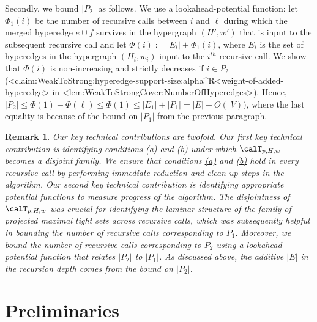 \documentclass{article}
\def\Cref#1{<#1>}%
\newtheorem{remark}{Remark}[section]
\newcommand{\maximalTightSetFamily}[1]{\ensuremath{\calT_{#1}}\xspace}
\newcommand{\kristof}[1]{{\color{purple}[{\tiny Kristof: \bf #1}]\marginpar{\color{red}*}}}
\begin{document}
Secondly, we bound $|P_2|$ as follows. We use a lookahead-potential function: let $\Phi_1(i)$ be the number of recursive calls between $i$ and $\ell$
during which the merged hyperedge $e\cup f$ survives in the hypergraph $(H', w')$ that is input to the subsequent recursive call
and let $\Phi(i):=|E_i|+\Phi_1(i)$, where $E_i$ is the set of hyperedges in the hypergraph $(H_i, w_i)$ input to the $i^{th}$ recursive call. We show that $\Phi(i)$ is non-increasing and strictly decreases if 
$i\in P_2$ 
(\Cref{claim:WeakToStrong:hyperedge-support-size:alpha^R<weight-of-added-hyperedge} in \Cref{lem:WeakToStrongCover:NumberOfHyperedges}). Hence, $|P_2|\le \Phi(1)-\Phi(\ell)\le \Phi(1) \le |E_1|+|P_1|=|E|+O(|V))$, where the last equality is because of the bound on $|P_1|$ from the previous paragraph.  

\begin{remark}
    Our key technical contributions are twofold. Our first key technical contribution is identifying conditions \hyperlink{WeakToStrong(a)}{(a)} and \hyperlink{WeakToStrong(b)}{(b)} under which $\maximalTightSetFamily{p, H, w}$ becomes a disjoint family. We ensure that conditions \hyperlink{WeakToStrong(a)}{(a)} and \hyperlink{WeakToStrong(b)}{(b)} hold in every recursive call by performing \emph{immediate} reduction and clean-up steps in the algorithm. 
    Our second key technical contribution is identifying appropriate potential functions to measure progress of the algorithm. The disjointness of $\maximalTightSetFamily{p, H, w}$ was crucial for identifying the laminar structure of the family of projected maximal tight sets across recursive calls, which was subsequently helpful in bounding the number of recursive calls corresponding to $P_1$. 
    Moreover, we bound the number of recursive calls corresponding to $P_2$ using a lookahead-potential function that relates $|P_2|$ to $|P_1|$. As discussed above, the additive $|E|$ in the recursion depth comes from the bound on $|P_2|$.
\end{remark}
\section{Preliminaries}\label{sec:prelims}
\end{document}
